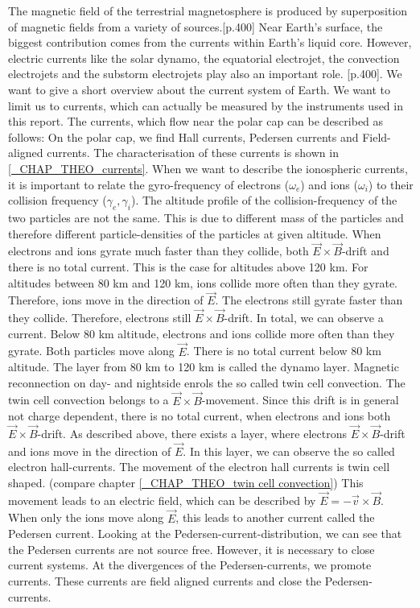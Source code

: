 \documentclass[10pt,a4paper]{article}
\begin{document}
The magnetic field of the terrestrial magnetosphere is produced by superposition of magnetic fields from a variety of sources.\cite{Buch2}[p.400]
Near Earth's surface, the biggest contribution comes from the currents within Earth's liquid core. However, electric currents like the solar dynamo, the equatorial electrojet, the convection electrojets and the substorm electrojets play also an important role. \cite{Buch2}[p.400]. 
We want to give a short overview about the current system of Earth. We want to limit us to currents, which can actually be measured by the instruments used in this report. The currents, which flow near the polar cap can be described as follows:
On the polar cap, we find Hall currents, Pedersen currents and Field-aligned currents. 
The characterisation of these currents is shown in \ref{_CHAP_THEO_currents}. When we want to describe the ionospheric currents, it is important to relate the gyro-frequency of electrons ($\omega_e$) and ions ($\omega_i$) to their collision frequency ($\gamma_e,\gamma_i$). The altitude profile of the collision-frequency of the two particles are not the same. This is due to different mass of the particles and therefore different particle-densities of the particles at given altitude. When electrons and ions gyrate much faster than they collide, both $\vec{E}\times \vec{B}$-drift and there is no total current. This is the case for altitudes above 120 km. For altitudes between 80 km and 120 km, ions collide more often than they gyrate. Therefore, ions move in the direction of $\vec{E}$. The electrons still gyrate faster than they collide. Therefore, electrons still $\vec{E}\times \vec{B}$-drift. In total, we can observe a current. Below 80 km altitude, electrons and ions collide more often than they gyrate. Both particles move along $\vec{E}$. There is no total current below 80 km altitude.
The layer from 80 km to 120 km is called the dynamo layer. 
Magnetic reconnection on day- and nightside enrols the so called twin cell convection. The twin cell convection belongs to a $\vec{E}\times \vec{B}$-movement. Since this drift is in general not charge dependent, there is no total current, when electrons and ions both $\vec{E}\times \vec{B}$-drift. As described above, there exists a layer, where electrons $\vec{E}\times \vec{B}$-drift and ions move in the direction of $\vec{E}$. In this layer, we can observe the so called electron hall-currents. The movement of the electron hall currents is twin cell shaped. (compare chapter \ref{_CHAP_THEO_twin cell convection}) This movement leads to an electric field, which can be described by $\vec{E}=-\vec{v}\times \vec{B}$. When only the ions move along $\vec{E}$, this leads to another current called the Pedersen current. Looking at the Pedersen-current-distribution, we can see that the Pedersen currents are not source free. However, it is necessary to close current systems. At the divergences of the Pedersen-currents, we promote currents. These currents are field aligned currents and close the Pedersen-currents. 
\end{document}
